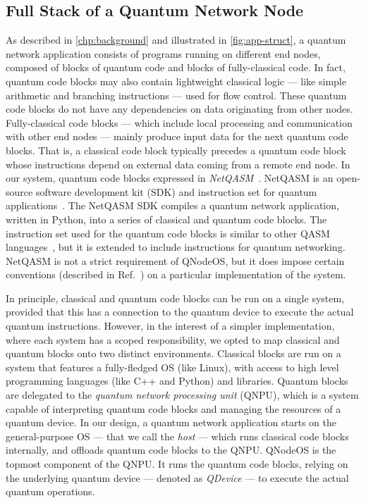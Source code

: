 \subsection{Full Stack of a Quantum Network Node}

As described in \cref{chp:background} and illustrated in \cref{fig:app-struct}, a quantum network
application consists of programs running on different end nodes, composed of blocks of quantum code
and blocks of fully-classical code. In fact, quantum code blocks may also contain lightweight
classical logic --- like simple arithmetic and branching instructions --- used for flow control.
These quantum code blocks do not have any dependencies on data originating from other nodes.
Fully-classical code blocks --- which include local processing and communication with other end
nodes --- mainly produce input data for the next quantum code blocks. That is, a classical code
block typically precedes a quantum code block whose instructions depend on external data coming from
a remote end node. In our system, quantum code blocks expressed in
\emph{NetQASM}~\cite{dahlberg_2022_netqasm}. NetQASM is an open-source software development kit
(SDK) and instruction set for quantum applications~\cite{netqasm_sdk}. The NetQASM SDK compiles a
quantum network application, written in Python, into a series of classical and quantum code blocks.
The instruction set used for the quantum code blocks is similar to other QASM
languages~\cite{cross_2017_qasm, khammassi_2018_cqasm, fu_2019_eqasm}, but it is extended to include
instructions for quantum networking. NetQASM is not a strict requirement of QNodeOS, but it does
impose certain conventions (described in Ref.~\cite{dahlberg_2022_netqasm}) on a particular
implementation of the system.

In principle, classical and quantum code blocks can be run on a single system, provided that this
has a connection to the quantum device to execute the actual quantum instructions. However, in the
interest of a simpler implementation, where each system has a scoped responsibility, we opted to map
classical and quantum blocks onto two distinct environments. Classical blocks are run on a system
that features a fully-fledged OS (like Linux), with access to high level programming languages (like
C++ and Python) and libraries. Quantum blocks are delegated to the \emph{quantum network processing
unit} (QNPU), which is a system capable of interpreting quantum code blocks and managing the
resources of a quantum device. In our design, a quantum network application starts on the
general-purpose OS --- that we call the \emph{host} --- which runs classical code blocks internally,
and offloads quantum code blocks to the QNPU. QNodeOS is the topmost component of the QNPU. It runs
the quantum code blocks, relying on the underlying quantum device --- denoted as \emph{QDevice} ---
to execute the actual quantum operations.

